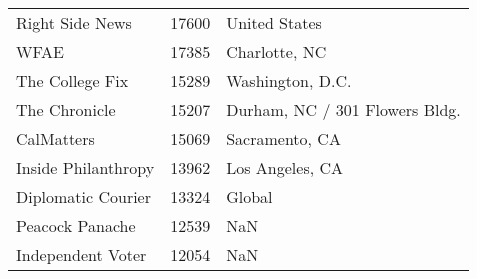 \begin{longtable}{lrl}
	Right Side News &      17600 &                         United States \\
	WFAE &      17385 &                         Charlotte, NC \\
	The College Fix &      15289 &                      Washington, D.C. \\
	The Chronicle &      15207 &        Durham, NC / 301 Flowers Bldg. \\
	CalMatters &      15069 &                        Sacramento, CA \\
	Inside Philanthropy &      13962 &                       Los Angeles, CA \\
	Diplomatic Courier &      13324 &                                Global \\
	Peacock Panache &      12539 &                                   NaN \\
	Independent Voter &      12054 &                                   NaN \\
	\bottomrule
\end{longtable}

%
%
